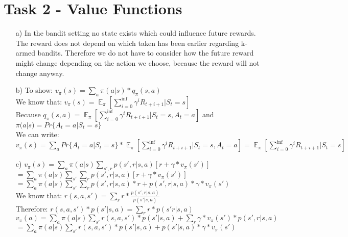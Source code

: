 \documentclass[a4paper]{article}
\DeclareMathOperator{\EX}{\mathbb{E}}%
\begin{document}
	\section*{Task 2 - Value Functions}
	\begin{itemize}
		\item[a)] In the bandit setting no state exists which could influence future rewards. 
				  The reward does not depend on which taken has been earlier regarding k-armed bandits.
				  Therefore we do not have to consider how the future reward might change depending on the action we choose, because the reward will not change anyway.
		\item[b)] To show: $v_\pi(s) = \sum_{a}^{} \pi(a|s)*q_\pi(s,a)$ \\
				  We know that: $v_\pi(s) = \EX_\pi [\sum_{i=0}^{\inf}\gamma^iR_{t+i+1}| S_t = s]$ \\
				  Because $q_\pi(s,a) = \EX_\pi [\sum_{i=0}^{\inf}\gamma^iR_{t+i+1}| S_t = s, A_t = a]$ and 
				  $\pi(a|s) = Pr\{A_t=a|S_t=s\}$ \\
				  We can write: \\ $v_\pi(s) = \sum_{a}^{}Pr\{A_t=a|S_t=s\}*\EX_\pi [\sum_{i=0}^{\inf}\gamma^iR_{t+i+1}| S_t = s, A_t = a] = \EX_\pi [\sum_{i=0}^{\inf}\gamma^iR_{t+i+1}| S_t = s]$
		\item[c)] $v_\pi(s)=\sum_{a}^{}\pi(a|s)\sum_{s',r}^{}p(s',r|s,a)[r+\gamma*v_\pi(s')]$ \\
				  $ = \sum_{a}^{}\pi(a|s)\sum_{s'}^{}\sum_{r}^{}p(s',r|s,a)[r+\gamma*v_\pi(s')] $ \\
				  $ = \sum_{a}^{}\pi(a|s)\sum_{s'}^{}\sum_{r}^{}p(s',r|s,a)*r + p(s',r|s,a)*\gamma*v_\pi(s')$ \\
				  We know that: $r(s,a,s') = \sum_{r}^{}r*\frac{p(s',r|s,a)}{p(s'|s,a)}$ \\
				  Therefore: $r(s,a,s') * p(s'|s,a) = \sum_{r}^{} r*p(s'r|s,a)$ \\
				  $ v_\pi(a) = \sum_{a}^{}\pi(a|s)\sum_{s'}^{}r(s,a,s')*p(s'|s,a)+\sum_{r}\gamma*v_\pi(s')*p(s',r|s,a)$ \\
				  $ = \sum_{a}^{}\pi(a|s)\sum_{s'}^{}r(s,a,s')*p(s'|s,a)+p(s'|s,a)*\gamma*v_\pi(s')$
	\end{itemize}
\end{document}
